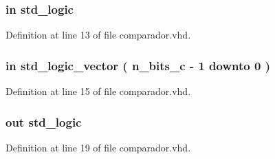 \subsubsection[{clk}]{ {\bfseries \textcolor{keywordflow}{in}\textcolor{vhdlchar}{ }} {\bfseries \textcolor{comment}{std\+\_\+logic}\textcolor{vhdlchar}{ }} \hspace{0.3cm}{\ttfamily [Port]}}\label{classcomparador_a4a4609c199d30b3adebbeb3a01276ec5}


Definition at line 13 of file comparador.\+vhd.

\hypertarget{classcomparador_a0c2a0581e706d5256b50516b6ca4dbed}{}
\subsubsection[{comp}]{ {\bfseries \textcolor{keywordflow}{in}\textcolor{vhdlchar}{ }} {\bfseries \textcolor{comment}{std\+\_\+logic\+\_\+vector}\textcolor{vhdlchar}{ }\textcolor{vhdlchar}{(}\textcolor{vhdlchar}{ }\textcolor{vhdlchar}{ }\textcolor{vhdlchar}{ }\textcolor{vhdlchar}{ }{\bfseries {\bf n\+\_\+bits\+\_\+c}} \textcolor{vhdlchar}{-\/}\textcolor{vhdlchar}{ } \textcolor{vhdldigit}{1} \textcolor{vhdlchar}{ }\textcolor{keywordflow}{downto}\textcolor{vhdlchar}{ }\textcolor{vhdlchar}{ } \textcolor{vhdldigit}{0} \textcolor{vhdlchar}{ }\textcolor{vhdlchar}{)}\textcolor{vhdlchar}{ }} \hspace{0.3cm}{\ttfamily [Port]}}\label{classcomparador_a0c2a0581e706d5256b50516b6ca4dbed}


Definition at line 15 of file comparador.\+vhd.

\hypertarget{classcomparador_a2522d63dc2aa0652b3cca6ac9b1da0bd}{}
\subsubsection[{comp\+\_\+out}]{ {\bfseries \textcolor{keywordflow}{out}\textcolor{vhdlchar}{ }} {\bfseries \textcolor{comment}{std\+\_\+logic}\textcolor{vhdlchar}{ }} \hspace{0.3cm}{\ttfamily [Port]}}\label{classcomparador_a2522d63dc2aa0652b3cca6ac9b1da0bd}


Definition at line 19 of file comparador.\+vhd.

